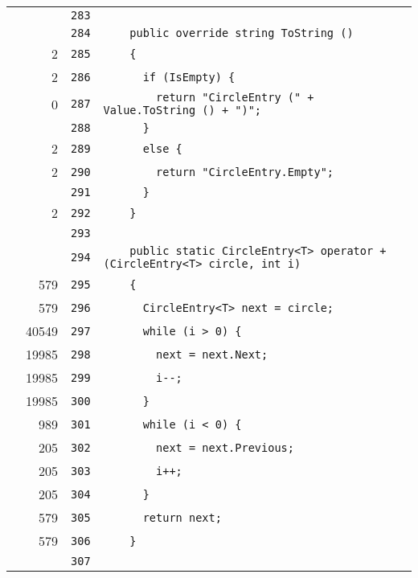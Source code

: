 \documentclass[a4paper,10pt]{article}
\begin{document}
\begin{longtable}[l]{lrrl}
\cellcolor{gray} &  & \verb~283~ & \verb~~\\
\cellcolor{gray} &  & \verb~284~ & \verb~    public override string ToString ()~\\
\cellcolor{green} & 2 & \verb~285~ & \verb~    {~\\
\cellcolor{green} & 2 & \verb~286~ & \verb~      if (IsEmpty) {~\\
\cellcolor{red} & 0 & \verb~287~ & \verb~        return "CircleEntry (" + Value.ToString () + ")";~\\
\cellcolor{gray} &  & \verb~288~ & \verb~      }~\\
\cellcolor{green} & 2 & \verb~289~ & \verb~      else {~\\
\cellcolor{green} & 2 & \verb~290~ & \verb~        return "CircleEntry.Empty";~\\
\cellcolor{gray} &  & \verb~291~ & \verb~      }~\\
\cellcolor{green} & 2 & \verb~292~ & \verb~    }~\\
\cellcolor{gray} &  & \verb~293~ & \verb~~\\
\cellcolor{gray} &  & \verb~294~ & \verb~    public static CircleEntry<T> operator + (CircleEntry<T> circle, int i)~\\
\cellcolor{green} & 579 & \verb~295~ & \verb~    {~\\
\cellcolor{green} & 579 & \verb~296~ & \verb~      CircleEntry<T> next = circle;~\\
\cellcolor{green} & 40549 & \verb~297~ & \verb~      while (i > 0) {~\\
\cellcolor{green} & 19985 & \verb~298~ & \verb~        next = next.Next;~\\
\cellcolor{green} & 19985 & \verb~299~ & \verb~        i--;~\\
\cellcolor{green} & 19985 & \verb~300~ & \verb~      }~\\
\cellcolor{green} & 989 & \verb~301~ & \verb~      while (i < 0) {~\\
\cellcolor{green} & 205 & \verb~302~ & \verb~        next = next.Previous;~\\
\cellcolor{green} & 205 & \verb~303~ & \verb~        i++;~\\
\cellcolor{green} & 205 & \verb~304~ & \verb~      }~\\
\cellcolor{green} & 579 & \verb~305~ & \verb~      return next;~\\
\cellcolor{green} & 579 & \verb~306~ & \verb~    }~\\
\cellcolor{gray} &  & \verb~307~ & \verb~~\\

\end{longtable}
\end{document}
